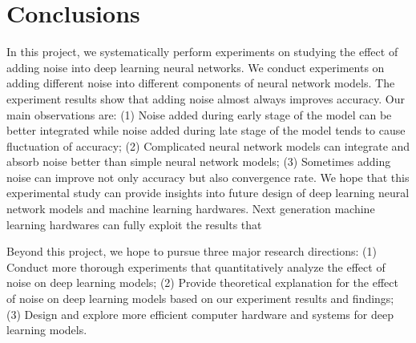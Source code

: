 \section{Conclusions}
\label{sec:conclusions}
In this project, we systematically perform experiments on studying the
effect of adding noise into deep learning neural networks.
We conduct experiments on adding different noise into different components
of neural network models. The experiment results show that adding noise almost always improves accuracy.
Our main observations are:
(1) Noise added during early stage of the model can be better integrated
while noise added during late stage of the model tends to cause
fluctuation of accuracy;
(2) Complicated neural network models can integrate and absorb
noise better than simple neural network models;
(3) Sometimes adding noise can improve not only accuracy but also
convergence rate.
We hope that this experimental study can provide insights into future design
of deep learning neural network models and machine learning hardwares.
Next generation machine learning hardwares can fully exploit the results that

Beyond this project, we hope to pursue three major research directions: (1)
Conduct more thorough experiments that quantitatively analyze the effect of
noise on deep learning models; (2) Provide theoretical explanation for the
effect of noise on deep learning models based on our experiment results and
findings; (3) Design and explore more efficient computer hardware and systems
for deep learning models.

